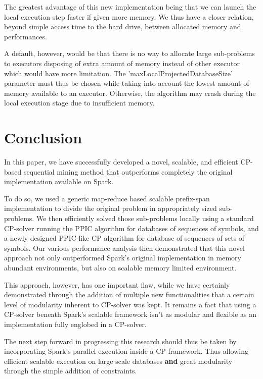 \documentclass{eplmastersthesis}
\begin{document}
The greatest advantage of this new implementation being that we can launch the local execution step faster if given more memory. We thus have a closer relation, beyond simple access time to the hard drive, between allocated memory and performances. \newline

A default, however, would be that there is no way to allocate large sub-problems to executors disposing of extra amount of memory instead of other executor which would have more limitation. The 'maxLocalProjectedDatabaseSize' parameter must thus be chosen while taking into account the lowest amount of memory available to an executor. Otherwise, the algorithm may crash during the local execution stage due to insufficient memory.

\section{Conclusion}

In this paper, we have successfully developed a novel, scalable, and
efficient CP-based sequential mining method that outperforms completely the original implementation available on Spark.\newline

To do so, we used a generic map-reduce based scalable prefix-span implementation to divide the original problem in appropriately sized sub-problems. We then efficiently solved those sub-problems locally using a standard CP-solver running the PPIC algorithm for databases of sequences of symbols, and a newly designed PPIC-like CP algorithm for database of sequences of sets of symbols. Our various performance analysis then demonstrated that this novel approach not only outperformed Spark's original implementation in memory abundant environments, but also on scalable memory limited environment. \newline

This approach, however, has one important flaw, while we have certainly demonstrated through the addition of multiple new functionalities that a certain level of modularity inherent to CP-solver was kept. It remains a fact that using a CP-solver beneath Spark's scalable framework isn't as modular and flexible as an implementation fully englobed in a CP-solver.

The next step forward in progressing this research should thus be taken by incorporating Spark's parallel execution inside a CP framework. Thus allowing efficient scalable execution on large scale databases \textbf{and} great modularity through the simple addition of constraints.
\end{document}
